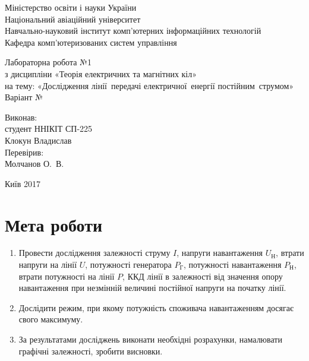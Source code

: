 \documentclass[a4paper,oneside,DIV=10,12pt]{scrartcl}
\begin{document}
	\begin{titlepage}
		\begin{center}
			Міністерство освіти і науки України\\
			Національний авіаційний університет\\
			Навчально-науковий інститут комп'ютерних інформаційних технологій\\
			Кафедра комп'ютеризованих систем управління
			
			\vspace{\fill}
				Лабораторна робота №1\\
				з дисципліни «Теорія електричних та магнітних кіл»\\
				на тему: «Дослідження лінії~передачі електричної~енергії постійним~струмом»\\
				Варіант №
				
			\vspace{\fill}
			
			\begin{flushright}
				Виконав:\\
				студент ННІКІТ СП-225\\
				Клокун Владислав\\
				Перевірив:\\
				Молчанов О.~В.
			\end{flushright}
			Київ 2017
		\end{center}
	\end{titlepage}
	
	\section{Мета роботи}
		\begin{enumerate}
			\item Провести дослідження залежності струму $I$, напруги навантаження $U_{\text{Н}}$, втрати напруги на лінії $U$, потужності генератора $P_{\text{Г}}$, потужності навантаження $P_{\text{Н}}$, втрати потужності на лінії $P$, ККД лінії в залежності від значення опору навантаження при незмінній величині постійної напруги на початку лінії.
			
			\item Дослідити режим, при якому потужність споживача навантаженням досягає свого максимуму.
			
			\item За результатами досліджень виконати необхідні розрахунки, намалювати графічні залежності, зробити висновки.
		\end{enumerate}
		
\end{document}
